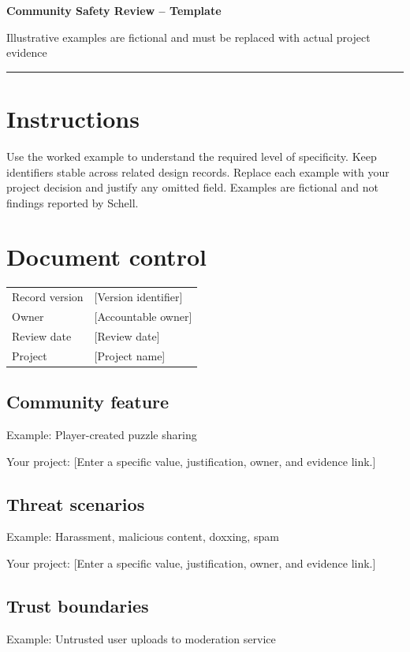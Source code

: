\documentclass[11pt]{article}
\begin{document}
{\huge\bfseries\color{suiteblue} Community Safety Review -- Template}\par
\vspace{0.15in}
{\normalsize\color{suitegray} Illustrative examples are fictional and must be replaced with actual project evidence}\par
\vspace{0.15in}\hrule\vspace{0.15in}

\section{Instructions}
Use the worked example to understand the required level of specificity. Keep identifiers stable across related design records. Replace each example with your project decision and justify any omitted field. Examples are fictional and not findings reported by Schell.


\section{Document control}
\begin{tabularx}{\linewidth}{@{}lX@{}}\toprule Record version & [Version identifier]\\ Owner & [Accountable owner]\\ Review date & [Review date]\\ Project & [Project name]\\\bottomrule\end{tabularx}

\subsection{Community feature}
Example: Player-created puzzle sharing

Your project: [Enter a specific value, justification, owner, and evidence link.]


\subsection{Threat scenarios}
Example: Harassment, malicious content, doxxing, spam

Your project: [Enter a specific value, justification, owner, and evidence link.]


\subsection{Trust boundaries}
Example: Untrusted user uploads to moderation service
\end{document}
